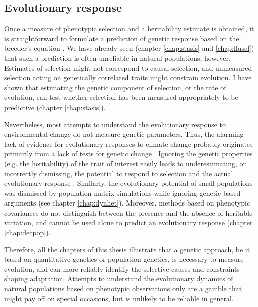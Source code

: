 \subsection{Evolutionary response}
Once a measure of phenotypic selection and a heritability estimate is obtained, it is straightforward to formulate a prediction of genetic response based on the breeder's equation \parencite{Lush1937, Falconer1996}. We have already seen (chapter \ref{chap:stasis} and \ref{chap:flusel}) that such a prediction is often unreliable in natural populations, however.  Estimates of selection might not correspond to causal selection, and unmeasured selection acting on genetically correlated traits might constrain evolution. I have shown that estimating the genetic component of selection, or the rate of evolution, can test whether selection has been measured appropriately to be predictive (chapter \ref{chap:stasis}). 

Nevertheless, most attempts to understand the evolutionary response to environmental change do not measure genetic parameters. Thus, the alarming lack of evidence for evolutionary responses to climate change probably originates primarily from a lack of tests for genetic change \parencite{Charmantier2014climate,Gienapp2014,Merila2014,Crozier2014}.
Ignoring the genetic properties (e.g. the heritability) of the trait of interest \parencite[e.g.][]{Forcada2014, Coulson2014, traill2014demography} easily leads to underestimating, or incorrectly dismissing, the potential to respond to selection and the actual evolutionary response \parencite{Nietlisbach2015, Chevin2015a, Pigeon2016}.
Similarly, the evolutionary potential of small populations was dismissed by population matrix simulations while ignoring genetic-based arguments (see chapter \ref{chap:dynhet}). Moreover, methods based on phenotypic covariances do not distinguish between the presence and the absence of heritable variation, and cannot be used alone to predict an evolutionary response (chapter \ref{chap:decpop}).

Therefore, all the chapters of this thesis illustrate that a genetic approach, be it based on quantitative genetics or population genetics, is necessary to measure evolution, and can more reliably identify the selective causes and constraints shaping adaptation. 
Attempts to understand the evolutionary dynamics of natural populations based on phenotypic observations only \parencite[e.g.][]{Smallegange2013} are a gamble that might pay off on special occasions, but is unlikely to be reliable in general. 

